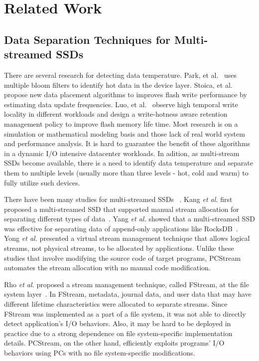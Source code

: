 \section{Related Work} 
\subsection{Data Separation Techniques for Multi-streamed SSDs}
There are several research for detecting data temperature. Park, et al.~\cite{multibloom} 
uses multiple bloom
filters to identify hot data in the device layer. Stoica, et al.~\cite{updatefreq}
propose new data placement algorithms to improves
flash write performance by estimating data update frequencies.
Luo, et al.~\cite{writehot} observe high temporal write
locality in different workloads and design a write-hotness
aware retention management policy to improve flash memory
life time. Most research is on a simulation or mathematical
modeling basis and those lack of real world system and
performance analysis. It is hard to guarantee the benefit
of these algorithms in a dynamic I/O intensive datacenter
workloads. In adition, as multi-stream SSDs
become available, there is a need to identify data temperature
and separate them to multiple levels (usually more
than three levels - hot, cold and warm) to fully utilize such
devices.

There have been many studies for multi-streamed SSDs ~\cite{MultiStream, Level,
vStream, FStream, AutoStream, PCStream}.  Kang {\it et al.} first proposed a
multi-streamed SSD that supported manual stream allocation for separating
different types of data~\cite{MultiStream}.  Yang {\it et al.} showed that a
multi-streamed SSD was effective for separating data of append-only
applications like RocksDB~\cite{Level}.  Yong {\it et al.} presented a virtual
stream management technique that allows logical streams, not physical streams,
to be allocated by applications.  Unlike these studies that involve modifying
the source code of target programs, \textsf{\small PCStream} automates the
stream allocation with no manual code modification.

Rho {\it et al.} proposed a stream management technique, called FStream, at the
file system layer~\cite{FStream}. In FStream, metadata, journal
data, and user data that may have different lifetime characteristics were
allocated to separate streams.  Since FStream was implemented as a part of a file
system, it was not able to directly detect application's I/O behaviors.
Also, it may be hard to be deployed in practice due to 
a strong dependence on file system-specific implementation details.
\textsf{\small PCStream}, on the other hand, efficiently exploits
programs' I/O behaviors using PCs with no file system-specific modifications.

